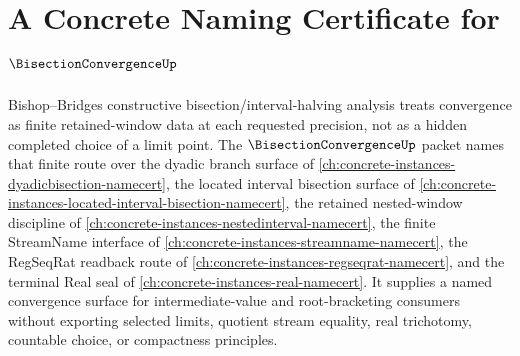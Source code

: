 \chapter{A Concrete Naming Certificate for $\BisectionConvergenceUp$}
\label{ch:concrete-instances-bisection-convergence-namecert}

Bishop--Bridges constructive bisection/interval-halving analysis treats convergence as finite retained-window data at each requested precision, not as a hidden completed choice of a limit point. The $\BisectionConvergenceUp$ packet names that finite route over the dyadic branch surface of \autoref{ch:concrete-instances-dyadicbisection-namecert}, the located interval bisection surface of \autoref{ch:concrete-instances-located-interval-bisection-namecert}, the retained nested-window discipline of \autoref{ch:concrete-instances-nestedinterval-namecert}, the finite StreamName interface of \autoref{ch:concrete-instances-streamname-namecert}, the RegSeqRat readback route of \autoref{ch:concrete-instances-regseqrat-namecert}, and the terminal Real seal of \autoref{ch:concrete-instances-real-namecert}. It supplies a named convergence surface for intermediate-value and root-bracketing consumers without exporting selected limits, quotient stream equality, real trichotomy, countable choice, or compactness principles.

